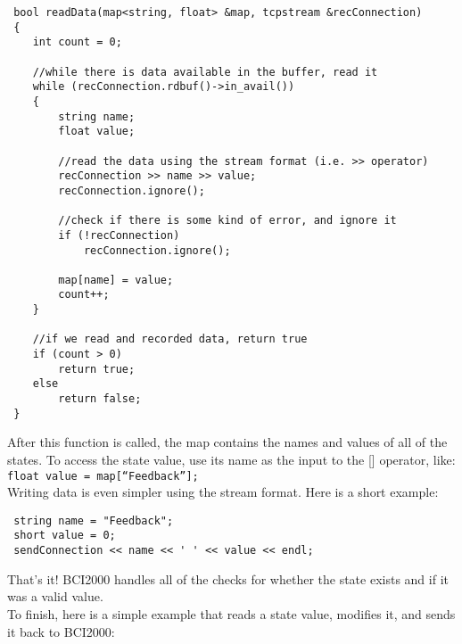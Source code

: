 \begin{verbatim}
 bool readData(map<string, float> &map, tcpstream &recConnection)
 {
    int count = 0;

    //while there is data available in the buffer, read it
    while (recConnection.rdbuf()->in_avail())
    {
        string name;
        float value;
    	
        //read the data using the stream format (i.e. >> operator)
        recConnection >> name >> value;
        recConnection.ignore();

        //check if there is some kind of error, and ignore it
        if (!recConnection)
            recConnection.ignore();

        map[name] = value;
        count++;
    }

    //if we read and recorded data, return true
    if (count > 0)
        return true;
    else
        return false;
 }
\end{verbatim}

After this function is called, the map contains the names and values of all of the states. To access the state value, use its name as the input to the [] operator, like:\\
\texttt{float value = map[``Feedback''];}\\

Writing data is even simpler using the stream format. Here is a short example:\\

\begin{verbatim}
 string name = "Feedback";
 short value = 0;
 sendConnection << name << ' ' << value << endl;
\end{verbatim}

That's it! BCI2000 handles all of the checks for whether the state exists and if it was a valid value.\\
To finish, here is a simple example that reads a state value, modifies it, and sends it back to BCI2000:

